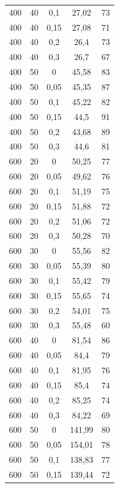 \documentclass{article}
\begin{document}
\begin{longtable}{c|c|c|c|c}
400    & 40   & 0,1   & 27,02   & 73    \\
400    & 40   & 0,15  & 27,08   & 71    \\
400    & 40   & 0,2   & 26,4    & 73    \\
400    & 40   & 0,3   & 26,7    & 67    \\
400    & 50   & 0     & 45,58   & 83    \\
400    & 50   & 0,05  & 45,35   & 87    \\
400    & 50   & 0,1   & 45,22   & 82    \\
400    & 50   & 0,15  & 44,5    & 91    \\
400    & 50   & 0,2   & 43,68   & 89    \\
400    & 50   & 0,3   & 44,6    & 81    \\
600    & 20   & 0     & 50,25   & 77    \\
600    & 20   & 0,05  & 49,62   & 76    \\
600    & 20   & 0,1   & 51,19   & 75    \\
600    & 20   & 0,15  & 51,88   & 72    \\
600    & 20   & 0,2   & 51,06   & 72    \\
600    & 20   & 0,3   & 50,28   & 70    \\
600    & 30   & 0     & 55,56   & 82    \\
600    & 30   & 0,05  & 55,39   & 80    \\
600    & 30   & 0,1   & 55,42   & 79    \\
600    & 30   & 0,15  & 55,65   & 74    \\
600    & 30   & 0,2   & 54,01   & 75    \\
600    & 30   & 0,3   & 55,48   & 60    \\
600    & 40   & 0     & 81,54   & 86    \\
600    & 40   & 0,05  & 84,4    & 79    \\
600    & 40   & 0,1   & 81,95   & 76    \\
600    & 40   & 0,15  & 85,4    & 74    \\
600    & 40   & 0,2   & 85,25   & 74    \\
600    & 40   & 0,3   & 84,22   & 69    \\
600    & 50   & 0     & 141,99  & 80    \\
600    & 50   & 0,05  & 154,01  & 78    \\
600    & 50   & 0,1   & 138,83  & 77    \\
600    & 50   & 0,15  & 139,44  & 72    \\

\end{longtable}
\end{document}
